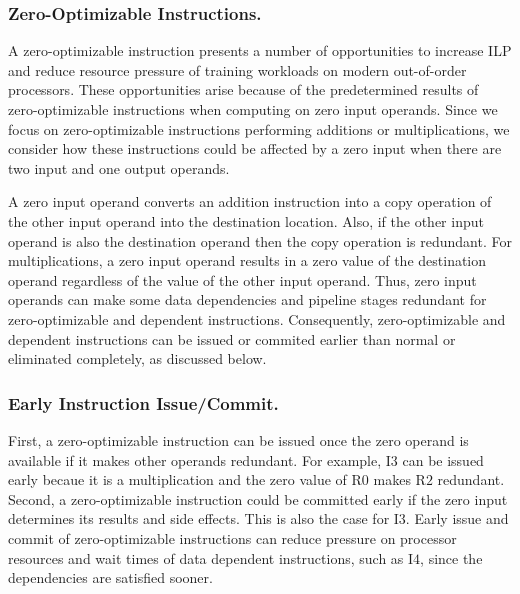 \subsubsection{Zero-Optimizable Instructions.} A zero-optimizable instruction presents a number of opportunities to increase ILP and reduce resource pressure of training workloads on modern out-of-order processors.  These opportunities arise because of the predetermined results of zero-optimizable instructions when computing on zero input operands.  Since we focus on zero-optimizable instructions performing additions or multiplications, we consider how these instructions could be affected by a zero input when there are two input and one output operands.  

 A zero input operand converts an addition instruction into a copy operation of the other input operand into the destination location. Also, if the other input operand is also the destination operand then the copy operation is redundant.  For multiplications, a zero input operand results in a zero value of the destination operand regardless of the value of the other input operand.  Thus, zero input operands can make some data dependencies and pipeline stages redundant for zero-optimizable and dependent instructions.  Consequently, zero-optimizable and dependent instructions can be issued or commited earlier than normal or eliminated completely, as discussed below. 

\subsubsection{Early Instruction Issue/Commit.}  First, a zero-optimizable instruction can be issued once the zero operand is available if it makes other operands redundant.  For example, I$3$ can be issued early becaue it is a multiplication and the zero value of R$0$ makes R$2$ redundant.  Second, a zero-optimizable instruction could be committed early if the zero input determines its results and side effects. This is also the case for I$3$. Early issue and commit of zero-optimizable instructions can reduce pressure on processor resources and wait times of data dependent instructions, such as I$4$, since the dependencies are satisfied sooner. 

